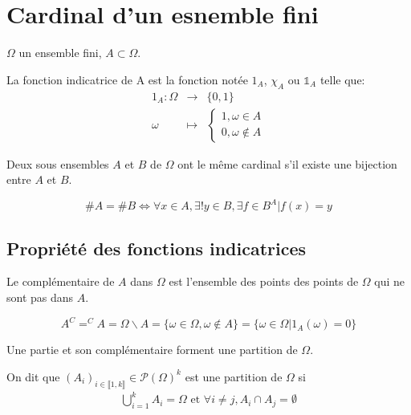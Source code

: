 \section{Cardinal d'un esnemble fini}
$\Omega$ un ensemble fini, $A\subset\Omega$.
\begin{definition}
  La fonction indicatrice de A est la fonction notée $1_A$, $\chi_A$ ou
  $\mathbb{1}_A$ telle que:
  \begin{eqnarray*}
    1_A : \Omega &\rightarrow& \{0, 1\}\\
          \omega &\mapsto& \begin{cases}
                          1, \omega\in A\\
                          0, \omega\notin A
                        \end{cases}
  \end{eqnarray*}
\end{definition}

\begin{proposition}
  Deux sous ensembles $A$ et $B$ de $\Omega$ ont le même cardinal s'il existe
  une bijection entre $A$ et $B$.

  \[\# A = \# B \iff \forall x \in A, \exists ! y \in B, \exists f\in B^A | f(x)=y\]

\end{proposition}

\subsection{Propriété des fonctions indicatrices}
\label{sub:Propriété des fonctions indicatrices}
  \begin{definition}
    Le complémentaire de $A$ dans $\Omega$ est l'ensemble des points des
    points de $\Omega$ qui ne sont pas dans $A$.

    \[A^C = ^CA = \Omega\backslash A = \{\omega\in\Omega, \omega\notin A\}
                                     = \{\omega\in\Omega|1_A(\omega)=0\}
    \]

  \end{definition}

  Une partie et son complémentaire forment une partition de $\Omega$.

  \begin{definition}
    On dit que $\left(A_i\right)_{i\in\llbracket 1,k\rrbracket} \in \mathcal{P}(\Omega)^k$
    est une partition de $\Omega$ si
    \begin{eqnarray*}
      \bigcup_{i=1}^k A_i = \Omega \text{ et } \forall i\neq j, A_i\cap A_j = \emptyset
    \end{eqnarray*}
  \end{definition}

